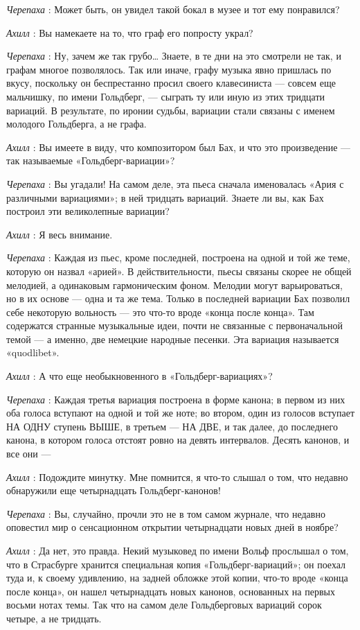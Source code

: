 \documentclass[../main.tex]{subfiles}
\begin{document}
\begin{dialogue}
\emph{Черепаха} : Может быть, он увидел такой бокал в музее и тот ему понравился?

\emph{Ахилл} : Вы намекаете на то, что граф его попросту украл?

\emph{Черепаха} : Ну, зачем же так грубо\ldots{} Знаете, в те дни на это смотрели не так, и графам многое позволялось. Так или иначе, графу музыка явно пришлась по вкусу, поскольку он беспрестанно просил своего клавесиниста --- совсем еще мальчишку, по имени Гольдберг, --- сыграть ту или иную из этих тридцати вариаций. В результате, по иронии судьбы, вариации стали связаны с именем молодого Гольдберга, а не графа.

\emph{Ахилл} : Вы имеете в виду, что композитором был Бах, и что это произведение --- так называемые «Гольдберг-вариации»?

\emph{Черепаха} : Вы угадали! На самом деле, эта пьеса сначала именовалась «Ария с различными вариациями»; в ней тридцать вариаций. Знаете ли вы, как Бах построил эти великолепные вариации?

\emph{Ахилл} : Я весь внимание.

\emph{Черепаха} : Каждая из пьес, кроме последней, построена на одной и той же теме, которую он назвал «арией». В действительности, пьесы связаны скорее не общей мелодией, а одинаковым гармоническим фоном. Мелодии могут варьироваться, но в их основе --- одна и та же тема. Только в последней вариации Бах позволил себе некоторую вольность --- это что-то вроде «конца после конца». Там содержатся странные музыкальные идеи, почти не связанные с первоначальной темой --- а именно, две немецкие народные песенки. Эта вариация называется «quodlibet».

\emph{Ахилл} : А что еще необыкновенного в «Гольдберг-вариациях»?

\emph{Черепаха} : Каждая третья вариация построена в форме канона; в первом из них оба голоса вступают на одной и той же ноте; во втором, один из голосов вступает НА ОДНУ ступень ВЫШЕ, в третьем --- НА ДВЕ, и так далее, до последнего канона, в котором голоса отстоят ровно на девять интервалов. Десять канонов, и все они ---

\emph{Ахилл} : Подождите минутку. Мне помнится, я что-то слышал о том, что недавно обнаружили еще четырнадцать Гольдберг-канонов!

\emph{Черепаха} : Вы, случайно, прочли это не в том самом журнале, что недавно оповестил мир о сенсационном открытии четырнадцати новых дней в ноябре?

\emph{Ахилл} : Да нет, это правда. Некий музыковед по имени Вольф прослышал о том, что в Страсбурге хранится специальная копия «Гольдберг-вариаций»; он поехал туда и, к своему удивлению, на задней обложке этой копии, что-то вроде «конца после конца», он нашел четырнадцать новых канонов, основанных на первых восьми нотах темы. Так что на самом деле Гольдберговых вариаций сорок четыре, а не тридцать.


\end{dialogue}
\end{document}
